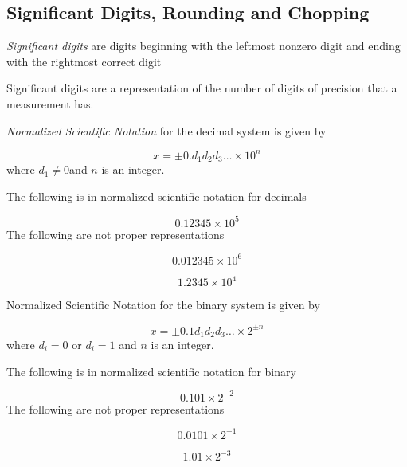 
\subsection{Significant Digits, Rounding and Chopping}

	
\begin{definition}
		\textit{Significant digits} are digits beginning with the leftmost nonzero digit and ending with the rightmost correct digit
	
\end{definition}

	Significant digits are a representation of the number of digits of precision that a measurement has.

	
\begin{definition}
		\textit{Normalized Scientific Notation} for the decimal system is given by
			
\[
x = \pm 0.d_{1}d_{2}d_{3}\dots\times 10^{n}
\]
		where \(d_{1} \not = 0\)and \(n\) is an integer.
	
\end{definition}

	
\begin{example}
		The following is in normalized scientific notation for decimals
			
\[
0.12345 \times 10^{5}
\]
		The following are not proper representations
			
\[
0.012345 \times 10^{6}
\]
			
\[
1.2345 \times 10^{4}	
\]
	
\end{example}

	
\begin{definition}
		Normalized Scientific Notation for the binary system is given by
			
\[
x = \pm 0.1d_{1}d_{2}d_{3}\dots\times 2^{\pm n}
\]
		where \(d_{i} = 0\) or \(d_{i} = 1\) and \(n\) is an integer.
	
\end{definition}

	
\begin{example}
		The following is in normalized scientific notation for binary
			
\[
0.101 \times 2^{-2}
\]
		The following are not proper representations
			
\[
0.0101\times 2^{-1}
\]
			
\[
1.01\times 2^{-3}
\]
		
\end{example}

